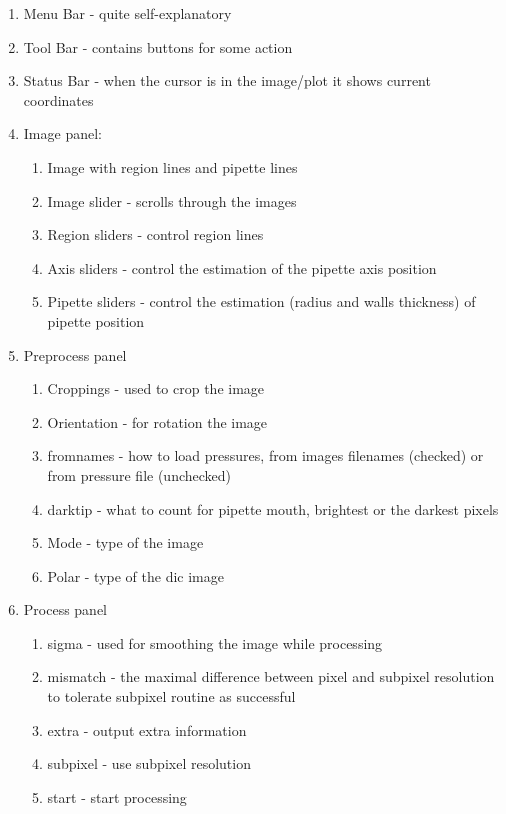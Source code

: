 \begin{enumerate}
	\item Menu Bar - quite self-explanatory
	\item Tool Bar - contains buttons for some action
	\item Status Bar - when the cursor is in the image/plot it shows current coordinates 
	\item Image panel:
	\begin{enumerate}
		\item Image with region lines and pipette lines
		\item Image slider - scrolls through the images
		\item Region sliders - control region lines
		\item Axis sliders - control the estimation of the pipette axis position
		\item Pipette sliders - control the estimation (radius and walls thickness) of pipette position
	\end{enumerate}
	\item Preprocess panel
	\begin{enumerate}
		\item Croppings - used to crop the image
		\item Orientation - for rotation the image
		\item fromnames - how to load pressures, from images filenames (checked) or from pressure file (unchecked)
		\item darktip - what to count for pipette mouth, brightest or the darkest pixels
		\item Mode - type of the image
		\item Polar - type of the dic image
	\end{enumerate}
	\item Process panel
	\begin{enumerate}
		\item sigma - used for smoothing the image while processing
		\item mismatch - the maximal difference between pixel and subpixel resolution to tolerate subpixel routine as successful
		\item extra - output extra information
		\item subpixel - use subpixel resolution
		\item start - start processing 
	\end{enumerate}
\end{enumerate}
